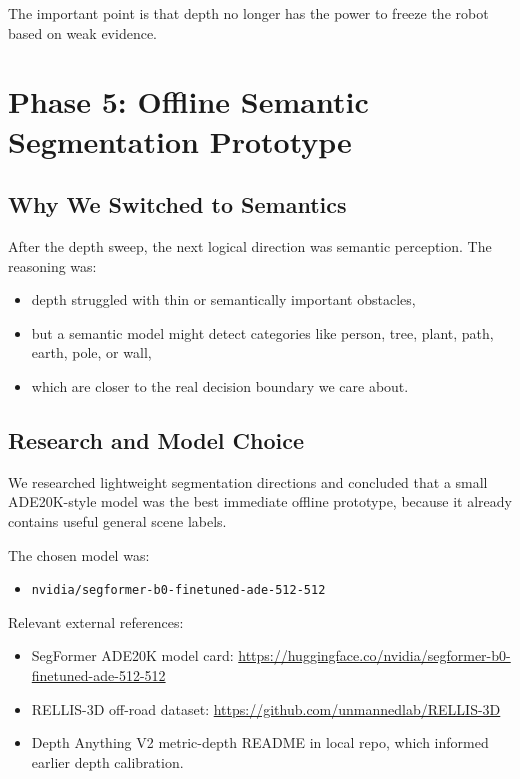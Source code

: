 \documentclass[11pt]{article}
\begin{document}
The important point is that depth no longer has the power to freeze the robot based on weak evidence.

\section{Phase 5: Offline Semantic Segmentation Prototype}
\subsection{Why We Switched to Semantics}
After the depth sweep, the next logical direction was semantic perception. The reasoning was:
\begin{itemize}[leftmargin=*]
\item depth struggled with thin or semantically important obstacles,
\item but a semantic model might detect categories like person, tree, plant, path, earth, pole, or wall,
\item which are closer to the real decision boundary we care about.
\end{itemize}

\subsection{Research and Model Choice}
We researched lightweight segmentation directions and concluded that a small ADE20K-style model was the best immediate offline prototype, because it already contains useful general scene labels.

The chosen model was:
\begin{itemize}[leftmargin=*]
\item \texttt{nvidia/segformer-b0-finetuned-ade-512-512}
\end{itemize}

Relevant external references:
\begin{itemize}[leftmargin=*]
\item SegFormer ADE20K model card: \url{https://huggingface.co/nvidia/segformer-b0-finetuned-ade-512-512}
\item RELLIS-3D off-road dataset: \url{https://github.com/unmannedlab/RELLIS-3D}
\item Depth Anything V2 metric-depth README in local repo, which informed earlier depth calibration.
\end{itemize}
\end{document}
